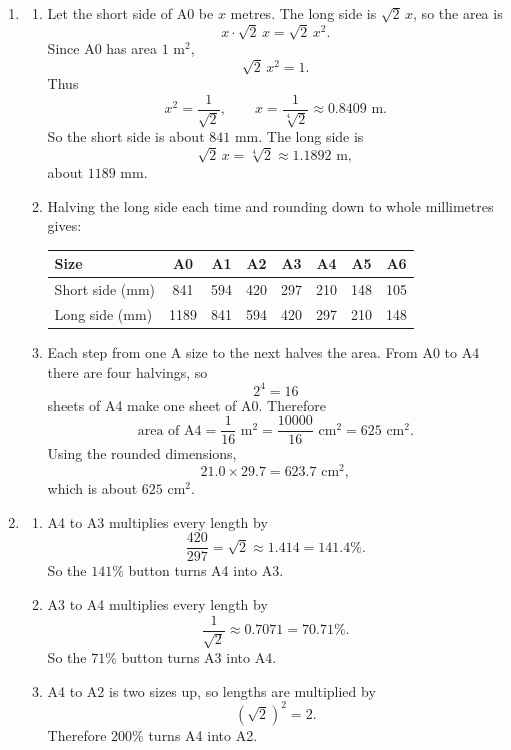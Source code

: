 \documentclass[11pt,a4paper]{article}
\begin{document}
\begin{enumerate}[label=\textbf{Q\arabic*.}, leftmargin=*, itemsep=1.2em]
\item
\begin{enumerate}[label=(\alph*)]
\item Let the short side of A0 be \(x\) metres. The long side is \(\sqrt2\,x\), so the area is
\[
x\cdot \sqrt2\,x=\sqrt2\,x^2.
\]
Since A0 has area \(1\text{ m}^2\),
\[
\sqrt2\,x^2=1.
\]
Thus
\[
x^2=\frac1{\sqrt2},
\qquad
x=\frac1{\sqrt[4]{2}}\approx 0.8409\text{ m}.
\]
So the short side is about \(841\text{ mm}\). The long side is
\[
\sqrt2\,x=\sqrt[4]{2}\approx 1.1892\text{ m},
\]
about \(1189\text{ mm}\).

\item Halving the long side each time and rounding down to whole millimetres gives:
\begin{center}
\begin{tabular}{|l|c|c|c|c|c|c|c|}
\hline
\textbf{Size} & A0 & A1 & A2 & A3 & A4 & A5 & A6\\
\hline
Short side (mm) & 841 & 594 & 420 & 297 & 210 & 148 & 105\\
\hline
Long side (mm) & 1189 & 841 & 594 & 420 & 297 & 210 & 148\\
\hline
\end{tabular}
\end{center}

\item Each step from one A size to the next halves the area. From A0 to A4 there are four halvings, so
\[
2^4=16
\]
sheets of A4 make one sheet of A0. Therefore
\[
\text{area of A4}=\frac{1}{16}\text{ m}^2
=\frac{10000}{16}\text{ cm}^2
=625\text{ cm}^2.
\]
Using the rounded dimensions,
\[
21.0\times 29.7=623.7\text{ cm}^2,
\]
which is about \(625\text{ cm}^2\).
\end{enumerate}

\item
\begin{enumerate}[label=(\alph*)]
\item A4 to A3 multiplies every length by
\[
\frac{420}{297}=\sqrt2\approx 1.414=141.4\%.
\]
So the \(141\%\) button turns A4 into A3.

\item A3 to A4 multiplies every length by
\[
\frac1{\sqrt2}\approx 0.7071=70.71\%.
\]
So the \(71\%\) button turns A3 into A4.

\item A4 to A2 is two sizes up, so lengths are multiplied by
\[
(\sqrt2)^2=2.
\]
Therefore \(200\%\) turns A4 into A2.


\end{enumerate}
\end{enumerate}
\end{document}
